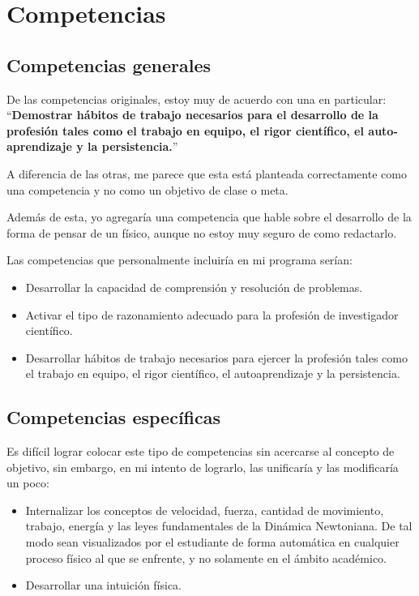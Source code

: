 \section{Competencias}

\subsection{Competencias generales}

De las competencias originales, estoy muy de acuerdo con una en particular:
``\textbf{Demostrar hábitos de trabajo necesarios para el desarrollo de la profesión tales como el trabajo en
equipo, el rigor científico, el auto-aprendizaje y la persistencia.}''

A diferencia de las otras, me parece que esta está planteada correctamente como una competencia y no como un objetivo de clase o meta.

Además de esta, yo agregaría una competencia que hable sobre el desarrollo de la forma de pensar de un físico, aunque no estoy muy seguro de como redactarlo.

Las competencias que personalmente incluiría en mi programa serían:

\begin{itemize}
    \item Desarrollar la capacidad de comprensión y resolución de problemas.
    \item Activar el tipo de razonamiento adecuado para la profesión de investigador científico.
    \item Desarrollar hábitos de trabajo necesarios para ejercer la profesión tales como el trabajo en equipo, el rigor científico, el autoaprendizaje y la persistencia.
\end{itemize}

\subsection{Competencias específicas}

Es difícil lograr colocar este tipo de competencias sin acercarse al concepto de objetivo, sin embargo, en mi intento de lograrlo, las unificaría y las modificaría un poco:

\begin{itemize}
    \item Internalizar los conceptos de velocidad, fuerza, cantidad de movimiento, trabajo, energía y las leyes fundamentales de la Dinámica Newtoniana. De tal modo sean visualizados por el estudiante de forma automática en cualquier proceso físico al que se enfrente, y no solamente en el ámbito académico.
    \item Desarrollar una intuición física.
\end{itemize}

